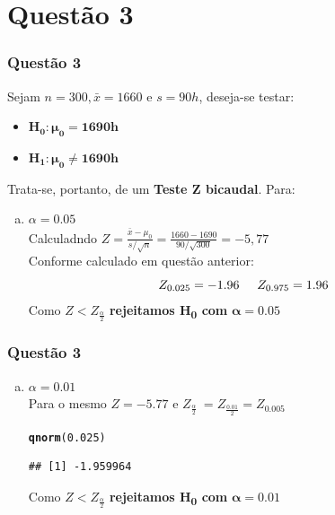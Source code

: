 \documentclass{beamer}\usepackage[]{graphicx}\usepackage[]{color}
\makeatletter
\newcommand{\hlnum}[1]{\textcolor[rgb]{0.686,0.059,0.569}{#1}}%
\newcommand{\hlstd}[1]{\textcolor[rgb]{0.345,0.345,0.345}{#1}}%
\newcommand{\hlkwd}[1]{\textcolor[rgb]{0.737,0.353,0.396}{\textbf{#1}}}%
\newenvironment{kframe}{%
 \def\at@end@of@kframe{}%
 \ifinner\ifhmode%
  \def\at@end@of@kframe{\end{minipage}}%
  \begin{minipage}{\columnwidth}%
 \fi\fi%
 \def\FrameCommand##1{\hskip\@totalleftmargin \hskip-\fboxsep
 \colorbox{shadecolor}{##1}\hskip-\fboxsep
     \hskip-\linewidth \hskip-\@totalleftmargin \hskip\columnwidth}%
 \MakeFramed {\advance\hsize-\width
   \@totalleftmargin\z@ \linewidth\hsize
   \@setminipage}}%
 {\par\unskip\endMakeFramed%
 \at@end@of@kframe}
\newenvironment{knitrout}{}{} %
\makeatother
\begin{document}
	\section{Questão 3}
	\begin{frame}
			\frametitle{Questão 3}
			Sejam $n = 300, \bar{x} = 1660$ e $s = 90h$, deseja-se testar:
			\begin{itemize}
				\item $\boldsymbol{H_{0}:  \mu_{0} = 1690h}$
				\item $\boldsymbol{H_{1}:  \mu_{0} \neq 1690h}$
			\end{itemize}
			Trata-se, portanto, de um \textbf{Teste Z bicaudal}.  Para:
			\begin{enumerate}[a)]
				\item $\alpha = 0.05$\\
				Calculadndo $Z = \frac{\bar{x} - \mu_{0}}{s/\sqrt{n}} = \frac{1660-1690}{90/\sqrt{300}} = -5,77$\\
				Conforme calculado em questão anterior:$$Z_{0.025} = -1.96 \hspace{0.5cm}Z_{0.975} = 1.96$$ 
				Como $ Z < Z_{\frac{\alpha}{2}}$ \textbf{rejeitamos H\textsubscript{0} com} $\boldsymbol{\alpha = 0.05}$  
			\end{enumerate}
		\end{frame}
		
		\begin{frame}[fragile]
			\frametitle{Questão 3}
			\begin{enumerate}[b)]
				\item $\alpha = 0.01$\\
				Para o mesmo $Z = -5.77$ e $Z_{\frac{\alpha}{2}} \ = Z_{\frac{0.01}{2}} = Z_{0.005} $
\begin{knitrout}
\color{fgcolor}\begin{kframe}
\begin{alltt}
\hlkwd{qnorm}\hlstd{(}\hlnum{0.025}\hlstd{)}
\end{alltt}
\begin{verbatim}
## [1] -1.959964
\end{verbatim}
\end{kframe}
\end{knitrout}
			Como $Z < Z_{\frac{\alpha}{2} }$ \textbf{rejeitamos H\textsubscript{0} com} $\boldsymbol{\alpha = 0.01}$
			\end{enumerate}
		\end{frame}
\end{document}

